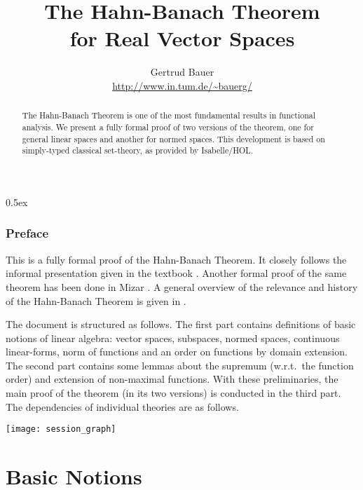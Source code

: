 \documentclass[10pt,a4paper,twoside]{article}
\begin{document}
\pagestyle{headings}

\title{The Hahn-Banach Theorem \\ for Real Vector Spaces}
\author{Gertrud Bauer \\ \url{http://www.in.tum.de/~bauerg/}}
\maketitle

\begin{abstract}
  The Hahn-Banach Theorem is one of the most fundamental results in functional
  analysis. We present a fully formal proof of two versions of the theorem,
  one for general linear spaces and another for normed spaces.  This
  development is based on simply-typed classical set-theory, as provided by
  Isabelle/HOL.
\end{abstract}


\tableofcontents
\parindent 0pt \parskip 0.5ex

\clearpage
\section{Preface}

This is a fully formal proof of the Hahn-Banach Theorem. It closely follows
the informal presentation given in the textbook \cite[{\S} 36]{Heuser:1986}.
Another formal proof of the same theorem has been done in Mizar
\cite{Nowak:1993}.  A general overview of the relevance and history of the
Hahn-Banach Theorem is given in \cite{Narici:1996}.

\medskip The document is structured as follows.  The first part contains
definitions of basic notions of linear algebra: vector spaces, subspaces,
normed spaces, continuous linear-forms, norm of functions and an order on
functions by domain extension.  The second part contains some lemmas about the
supremum (w.r.t.\ the function order) and extension of non-maximal functions.
With these preliminaries, the main proof of the theorem (in its two versions)
is conducted in the third part.  The dependencies of individual theories are
as follows.

\begin{center}
  \texttt{[image: session\_graph]}  
\end{center}

\clearpage
\part {Basic Notions}
\end{document}
